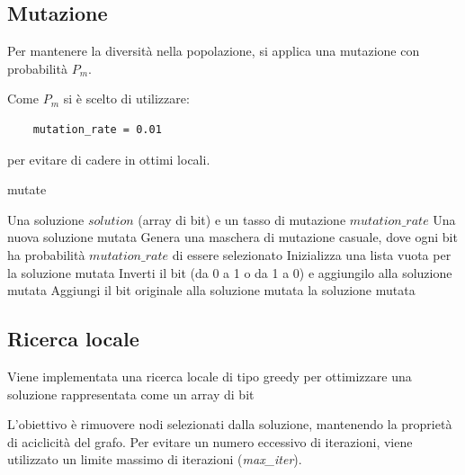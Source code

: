 \documentclass[a4paper,12pt]{article}
\begin{document}
\subsection{Mutazione}
Per mantenere la diversità nella popolazione, si applica una mutazione con probabilità $P_m$.

Come $P_m$ si è scelto di utilizzare:
\begin{verbatim}
    mutation_rate = 0.01
\end{verbatim}
per evitare di cadere in ottimi locali.
\begin{algorithm}[H]
\caption{mutate}
\begin{algorithmic}[1]
\Require Una soluzione $\mathit{solution}$ (array di bit) e un tasso di mutazione $\mathit{mutation\_rate}$
\Ensure Una nuova soluzione mutata
\State Genera una maschera di mutazione casuale, dove ogni bit ha probabilità $\mathit{mutation\_rate}$ di essere selezionato
\State Inizializza una lista vuota per la soluzione mutata
        \State Inverti il bit (da 0 a 1 o da 1 a 0) e aggiungilo alla soluzione mutata
    \Else
        \State Aggiungi il bit originale alla soluzione mutata
    \EndIf
\EndFor
\State \Return la soluzione mutata
\end{algorithmic}
\end{algorithm}

\subsection{Ricerca locale}
Viene implementata una ricerca locale di tipo greedy per ottimizzare una soluzione rappresentata come un array di bit

L'obiettivo è rimuovere nodi selezionati dalla soluzione, mantenendo la proprietà di aciclicità del grafo. Per evitare un numero eccessivo di iterazioni, viene utilizzato un limite massimo di iterazioni (\textit{max\_iter}).
\end{document}
